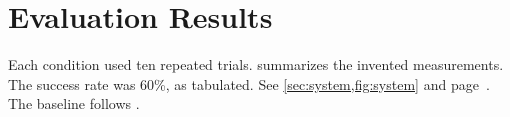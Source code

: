 \section{Evaluation Results}
Each condition used ten repeated trials.
 summarizes the invented measurements.
The success rate was 60\%, as tabulated.
See \cref{sec:system,fig:system} and page~\pageref{tab:success}.
The baseline follows \textcite[Section 2]{simple_grasp}.
